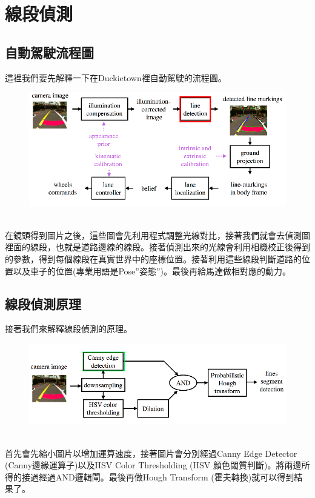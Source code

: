\documentclass{article}
\begin{document}
\newpage
\section{線段偵測}
\subsection{自動駕駛流程圖}
這裡我們要先解釋一下在Duckietown裡自動駕駛的流程圖。
\
\begin{figure}[htp]
    \begin{center}
        \includegraphics[width=450pt]{pic/3_2_1.png}
    \end{center}
\end{figure}
\\
在鏡頭得到圖片之後，這些圖會先利用程式調整光線對比，接著我們就會去偵測圖裡面的線段，也就是道路邊線的線段。接著偵測出來的光線會利用相機校正後得到的參數，得到每個線段在真實世界中的座標位置。接著利用這些線段判斷道路的位置以及車子的位置(專業用語是Pose”姿態”)。最後再給馬達做相對應的動力。

\subsection{線段偵測原理}
接著我們來解釋線段偵測的原理。
\
\begin{figure}[htp]
    \begin{center}
        \includegraphics[width=450pt]{pic/3_2_2.png}
    \end{center}
\end{figure}
\\
首先會先縮小圖片以增加運算速度，接著圖片會分別經過Canny Edge Detector (Canny邊緣運算子)以及HSV Color Thresholding (HSV 顏色閾質判斷)。將兩邊所得的接過經過AND邏輯閘。最後再做Hough Transform (霍夫轉換)就可以得到結果了。
\end{document}
